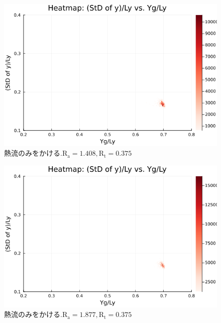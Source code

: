 \begin{figure}[H]
  \centering
  \includegraphics[scale=0.6]{image/g0_heat/2024-01-15T14:07:35.797_mapg0_chiinf_Ay50_rho0.4_T0.43_dT0.04_Rd0.0_Rt0.375_Ra1.4081535_g0_run4.0e7.png}
  \caption{$熱流のみをかける. \text{R}_\text{a}=1.408,\text{R}_\text{t}=0.375$}
  \label{}
\end{figure}

\begin{figure}[H]
  \centering
  \includegraphics[scale=0.6]{image/g0_heat/2024-01-15T14:07:35.863_mapg0_chiinf_Ay50_rho0.4_T0.43_dT0.04_Rd0.0_Rt0.375_Ra1.877538_g0_run4.0e7.png}
  \caption{$熱流のみをかける. \text{R}_\text{a}=1.877,\text{R}_\text{t}=0.375$}
  \label{}
\end{figure}

